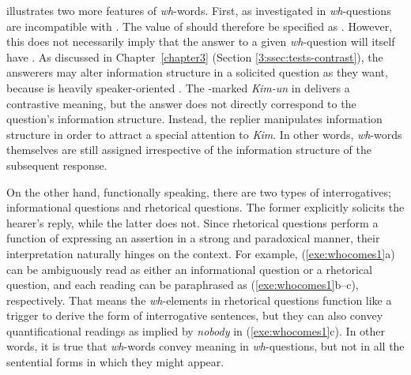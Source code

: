  illustrates two more features of
\textit{wh}-words. First, as investigated in \citet{gryllia:09}
\textit{wh}-questions are incompatible with .
The value of  should therefore be specified as
. However, this does not
necessarily imply that the answer to a given \textit{wh}-question will
itself have . As
discussed in Chapter~\ref{chapter3} (Section \ref{3:ssec:tests-contrast}), the
answerers may alter information structure in a solicited question as
they want, because  is heavily speaker-oriented
\citep{chang:02}.  The \onun-marked \textit{Kim-un} in
 delivers a contrastive
meaning, but the answer does not directly correspond to
the question's information structure. Instead, the replier manipulates
information structure in order to attract a special attention to
\textit{Kim}. In other words, \textit{wh}-words themselves are still
assigned  irrespective of the information
structure of the subsequent response.






On the other hand, functionally speaking, there are two types of
interrogatives; informational questions and rhetorical questions. The
former explicitly solicits the hearer's reply, while the latter does
not. Since rhetorical questions perform a function of expressing an
assertion in a strong and paradoxical manner, their interpretation
naturally hinges on the context. For example, (\ref{exe:whocomes1}a)
can be ambiguously read as either an informational question or a
rhetorical question, and each reading can be paraphrased as
(\ref{exe:whocomes1}b--c), respectively. That means the
\textit{wh}-elements in rhetorical questions function like a trigger
to derive the form of interrogative sentences,
but they can also convey quantificational readings as implied by
\textit{nobody} in (\ref{exe:whocomes1}c). In other
words, it is true that \textit{wh}-words convey  meaning in
\textit{wh}-questions, but not in all the sentential forms in which
they might appear.



